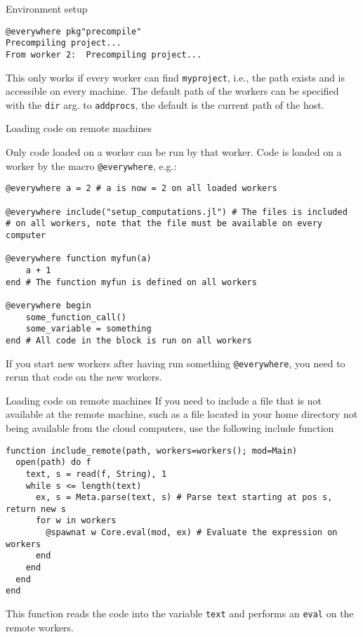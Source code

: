 \documentclass[10pt]{beamer}
\begin{document}
\begin{frame}[fragile]{Environment setup}{}
\begin{verbatim}
@everywhere pkg"precompile"
Precompiling project...
From worker 2:	Precompiling project...
		\end{verbatim}
		This only works if every worker can find \texttt{myproject}, i.e., the path exists and is accessible on every machine. The default path of the workers can be specified with the \texttt{dir} arg. to \texttt{addprocs}, the default is the current path of the host.

\end{frame}



\begin{frame}[fragile]{Loading code on remote machines}{}

Only code loaded on a worker can be run by that worker. Code is loaded on a worker by the macro \verb+@everywhere+, e.g.:
\begin{verbatim}
@everywhere a = 2 # a is now = 2 on all loaded workers

@everywhere include("setup_computations.jl") # The files is included
# on all workers, note that the file must be available on every computer

@everywhere function myfun(a)
    a + 1
end # The function myfun is defined on all workers

@everywhere begin
    some_function_call()
    some_variable = something
end # All code in the block is run on all workers
\end{verbatim}
If you start new workers after having run something \texttt{@everywhere}, you need to rerun that code on the new workers.

\end{frame}


\begin{frame}[fragile]{Loading code on remote machines}
If you need to include a file that is not available at the remote machine, such as a file located in your home directory not being available from the cloud computers, use the following include function
\begin{verbatim}
function include_remote(path, workers=workers(); mod=Main)
  open(path) do f
    text, s = read(f, String), 1
    while s <= length(text)
      ex, s = Meta.parse(text, s) # Parse text starting at pos s, return new s
      for w in workers
        @spawnat w Core.eval(mod, ex) # Evaluate the expression on workers
      end
    end
  end
end
\end{verbatim}
This function reads the code into the variable \texttt{text} and performs an \texttt{eval} on the remote workers.
\end{frame}
\end{document}
